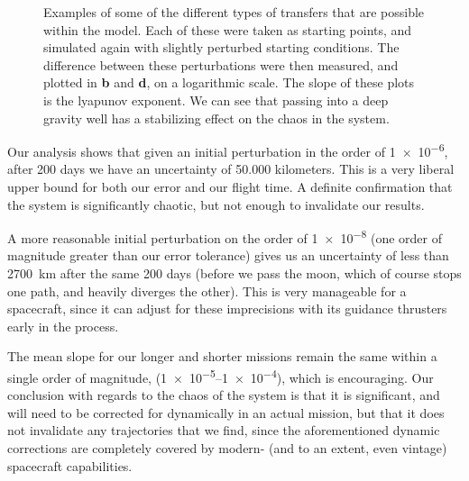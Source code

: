\begin{figure}
{        \label{fig:long_leto_slope}
    }
    \caption{Examples of some of the different types of transfers that are possible within the model. Each of these were taken as starting points, and simulated again with slightly perturbed starting conditions. The difference between these perturbations were then measured, and plotted in \textbf{b} and \textbf{d}, on a logarithmic scale. The slope of these plots is the lyapunov exponent. We can see that passing into a deep gravity well has a stabilizing effect on the chaos in the system.}
    \label{fig:lyapunov}
\end{figure} 

Our analysis shows that given an initial perturbation in the order of \num{1e-6}, after 200 days we have an uncertainty of 50.000 kilometers. This is a very liberal upper bound for both our error and our flight time. A definite confirmation that the system is significantly chaotic, but not enough to invalidate our results. 

A more reasonable initial perturbation on the order of \num{1e-8} (one order of magnitude greater than our error tolerance) gives us an uncertainty of less than \SI{2700}{km} after the same 200 days (before we pass the moon, which of course stops one path, and heavily diverges the other). This is very manageable for a spacecraft, since it can adjust for these imprecisions with its guidance thrusters early in the process.

The mean slope for our longer and shorter missions remain the same within a single order of magnitude, (\numrange{1e-5}{1e-4}), which is encouraging. Our conclusion with regards to the chaos of the system is that it is significant, and will need to be corrected for dynamically in an actual mission, but that it does not invalidate any trajectories that we find, since the aforementioned dynamic corrections are completely covered by modern- (and to an extent, even vintage) spacecraft capabilities.
